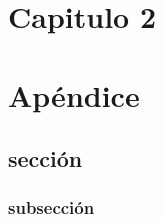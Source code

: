 \documentclass[ttftimes]{tesisusb}
\begin{document}
\indicegeneral
\listadetablas
\listadefiguras

\begin{onehalfspace}
\cuerpo



\chapter{Capitulo 2}
\lipsum

\apendices

\chapter{Apéndice}
\section{sección}
\subsection{subsección}

%
%

\end{onehalfspace}
\end{document}
